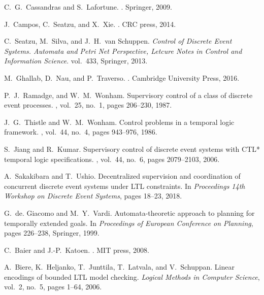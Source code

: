 \documentclass[journal,twoside,web]{IEEEtran}
\begin{document}
\begin{thebibliography}{99}

%
C.~G.~Cassandras and S.~Lafortune.
.
\newblock Springer, 2009.

%
J.~Campos, C.~Seatzu, and X.~Xie.
.
\newblock CRC press, 2014.

%
C.~Seatzu, M.~Silva, and J.~H.~van Schuppen.
\newblock \emph{Control of Discrete Event Systems. Automata and Petri Net Perspective, Letcure Notes in Control and Information Science}. vol.~433,
\newblock Springer, 2013.

M.~Ghallab, D.~Nau, and P.~Traverso.
.
\newblock Cambridge University Press, 2016.

%
P.~J.~Ramadge, and W.~M.~Wonham.
\newblock Supervisory control of a class of discrete event processes.
, vol.~25, no.~1, pages 206--230, 1987.

%
J.~G.~Thistle and W.~M.~Wonham.
\newblock Control problems in a temporal logic framework.
, vol.~44, no.~4, pages 943--976, 1986.

%
S.~Jiang and R.~Kumar.
\newblock Supervisory control of discrete event systems with CTL* temporal logic specifications.
, vol.~44, no.~6, pages 2079--2103, 2006.

%
A.~Sakakibara and T.~Ushio.
\newblock Decentralized supervision and coordination of concurrent discrete event systems under LTL constraints.
\newblock In \emph{Proceedings 14th Workshop on Discrete Event Systems}, pages 18--23, 2018.

%
G.~de. Giacomo and M.~Y.~Vardi.
\newblock Automata-theoretic approach to planning for temporally extended goals.
\newblock In {\em Proceedings of European Conference on Planning}, pages 226--238, Springer, 1999.

%
C.~Baier and J.-P.~Katoen.
.
\newblock MIT press, 2008.

%
A.~Biere, K.~Heljanko, T.~Junttila, T.~Latvala, and V.~Schuppan.
\newblock Linear encodings of bounded LTL model checking.
\newblock \emph{Logical Methods in Computer Science}, vol.~2, no.~5, pages 1--64, 2006.


\end{thebibliography}
\end{document}
